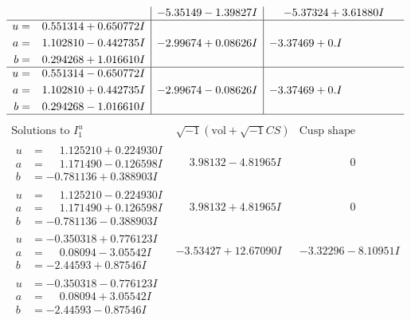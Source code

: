 \documentclass[1p]{elsarticle_modified}
\theoremstyle{definition}
\newcommand{\I}{\sqrt{-1}}
\begin{document}
$$\begin{array}{c|c|c}
 & -5.35149 - 1.39827 I & -5.37324 + 3.61880 I \\ \hline\begin{aligned}
u &= \phantom{-}0.551314 + 0.650772 I \\
a &= \phantom{-}1.102810 - 0.442735 I \\
b &= \phantom{-}0.294268 + 1.016610 I\end{aligned}
 & -2.99674 + 0.08626 I & -3.37469 + 0. I\phantom{ +0.000000I} \\ \hline\begin{aligned}
u &= \phantom{-}0.551314 - 0.650772 I \\
a &= \phantom{-}1.102810 + 0.442735 I \\
b &= \phantom{-}0.294268 - 1.016610 I\end{aligned}
 & -2.99674 - 0.08626 I & -3.37469 + 0. I\phantom{ +0.000000I}\\
 \hline 
 \end{array}$$\newpage$$\begin{array}{c|c|c}  
\text{Solutions to }I^u_{1}& \I (\text{vol} + \sqrt{-1}CS) & \text{Cusp shape}\\
 \hline 
\begin{aligned}
u &= \phantom{-}1.125210 + 0.224930 I \\
a &= \phantom{-}1.171490 - 0.126598 I \\
b &= -0.781136 + 0.388903 I\end{aligned}
 & \phantom{-}3.98132 - 4.81965 I & \phantom{-0.000000 } 0 \\ \hline\begin{aligned}
u &= \phantom{-}1.125210 - 0.224930 I \\
a &= \phantom{-}1.171490 + 0.126598 I \\
b &= -0.781136 - 0.388903 I\end{aligned}
 & \phantom{-}3.98132 + 4.81965 I & \phantom{-0.000000 } 0 \\ \hline\begin{aligned}
u &= -0.350318 + 0.776123 I \\
a &= \phantom{-}0.08094 - 3.05542 I \\
b &= -2.44593 + 0.87546 I\end{aligned}
 & -3.53427 + 12.67090 I & -3.32296 - 8.10951 I \\ \hline\begin{aligned}
u &= -0.350318 - 0.776123 I \\
a &= \phantom{-}0.08094 + 3.05542 I \\
b &= -2.44593 - 0.87546 I\end{aligned}

\end{array}$$
\end{document}
